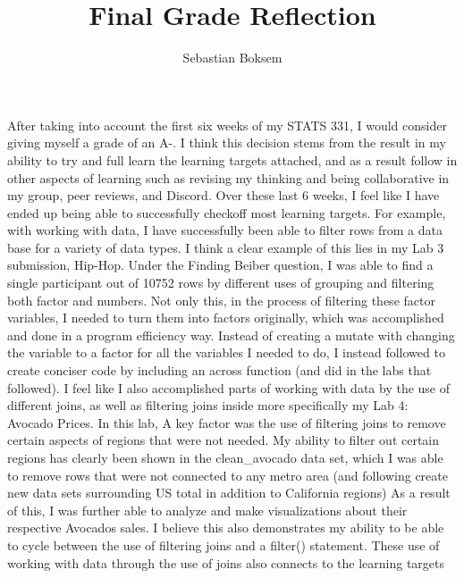 \documentclass[
  letterpaper,
  DIV=11,
  numbers=noendperiod]{scrartcl}
\title{Final Grade Reflection}
\author{Sebastian Boksem}
\date{}
\begin{document}
\maketitle
\ifdefined\Shaded\renewenvironment{Shaded}{\begin{tcolorbox}[enhanced, sharp corners, boxrule=0pt, frame hidden, interior hidden, borderline west={3pt}{0pt}{shadecolor}, breakable]}{\end{tcolorbox}}\fi

After taking into account the first six weeks of my STATS 331, I would
consider giving myself a grade of an A-. I think this decision stems
from the result in my ability to try and full learn the learning targets
attached, and as a result follow in other aspects of learning such as
revising my thinking and being collaborative in my group, peer reviews,
and Discord. Over these last 6 weeks, I feel like I have ended up being
able to successfully checkoff most learning targets. For example, with
working with data, I have successfully been able to filter rows from a
data base for a variety of data types. I think a clear example of this
lies in my Lab 3 submission, Hip-Hop. Under the Finding Beiber question,
I was able to find a single participant out of 10752 rows by different
uses of grouping and filtering both factor and numbers. Not only this,
in the process of filtering these factor variables, I needed to turn
them into factors originally, which was accomplished and done in a
program efficiency way. Instead of creating a mutate with changing the
variable to a factor for all the variables I needed to do, I instead
followed to create conciser code by including an across function (and
did in the labs that followed). I feel like I also accomplished parts of
working with data by the use of different joins, as well as filtering
joins inside more specifically my Lab 4: Avocado Prices. In this lab, A
key factor was the use of filtering joins to remove certain aspects of
regions that were not needed. My ability to filter out certain regions
has clearly been shown in the clean\_avocado data set, which I was able
to remove rows that were not connected to any metro area (and following
create new data sets surrounding US total in addition to California
regions) As a result of this, I was further able to analyze and make
visualizations about their respective Avocados sales. I believe this
also demonstrates my ability to be able to cycle between the use of
filtering joins and a filter() statement. These use of working with data
through the use of joins also connects to the learning targets
\end{document}
